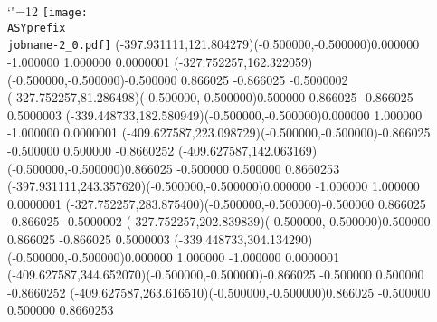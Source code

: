 \setlength{\unitlength}{1pt}
\makeatletter%
\let\ASYencoding\f@encoding%
\let\ASYfamily\f@family%
\let\ASYseries\f@series%
\let\ASYshape\f@shape%
\makeatother%
{\catcode`"=12%
\texttt{[image: \\ASYprefix\\jobname-2\_0.pdf]}%
}%
\color{ASYcolor}
\fontsize{12.000000}{14.400000}\selectfont
\usefont{\ASYencoding}{\ASYfamily}{\ASYseries}{\ASYshape}%
\ASYalignT(-397.931111,121.804279)(-0.500000,-0.500000){0.000000 -1.000000 1.000000 0.000000}{1}%
\color{ASYcolor}
\fontsize{12.000000}{14.400000}\selectfont
\ASYalignT(-327.752257,162.322059)(-0.500000,-0.500000){-0.500000 0.866025 -0.866025 -0.500000}{2}%
\color{ASYcolor}
\fontsize{12.000000}{14.400000}\selectfont
\ASYalignT(-327.752257,81.286498)(-0.500000,-0.500000){0.500000 0.866025 -0.866025 0.500000}{3}%
\color{ASYcolor}
\fontsize{12.000000}{14.400000}\selectfont
\ASYalignT(-339.448733,182.580949)(-0.500000,-0.500000){0.000000 1.000000 -1.000000 0.000000}{1}%
\color{ASYcolor}
\fontsize{12.000000}{14.400000}\selectfont
\ASYalignT(-409.627587,223.098729)(-0.500000,-0.500000){-0.866025 -0.500000 0.500000 -0.866025}{2}%
\color{ASYcolor}
\fontsize{12.000000}{14.400000}\selectfont
\ASYalignT(-409.627587,142.063169)(-0.500000,-0.500000){0.866025 -0.500000 0.500000 0.866025}{3}%
\color{ASYcolor}
\fontsize{12.000000}{14.400000}\selectfont
\ASYalignT(-397.931111,243.357620)(-0.500000,-0.500000){0.000000 -1.000000 1.000000 0.000000}{1}%
\color{ASYcolor}
\fontsize{12.000000}{14.400000}\selectfont
\ASYalignT(-327.752257,283.875400)(-0.500000,-0.500000){-0.500000 0.866025 -0.866025 -0.500000}{2}%
\color{ASYcolor}
\fontsize{12.000000}{14.400000}\selectfont
\ASYalignT(-327.752257,202.839839)(-0.500000,-0.500000){0.500000 0.866025 -0.866025 0.500000}{3}%
\color{ASYcolor}
\fontsize{12.000000}{14.400000}\selectfont
\ASYalignT(-339.448733,304.134290)(-0.500000,-0.500000){0.000000 1.000000 -1.000000 0.000000}{1}%
\color{ASYcolor}
\fontsize{12.000000}{14.400000}\selectfont
\ASYalignT(-409.627587,344.652070)(-0.500000,-0.500000){-0.866025 -0.500000 0.500000 -0.866025}{2}%
\color{ASYcolor}
\fontsize{12.000000}{14.400000}\selectfont
\ASYalignT(-409.627587,263.616510)(-0.500000,-0.500000){0.866025 -0.500000 0.500000 0.866025}{3}%
